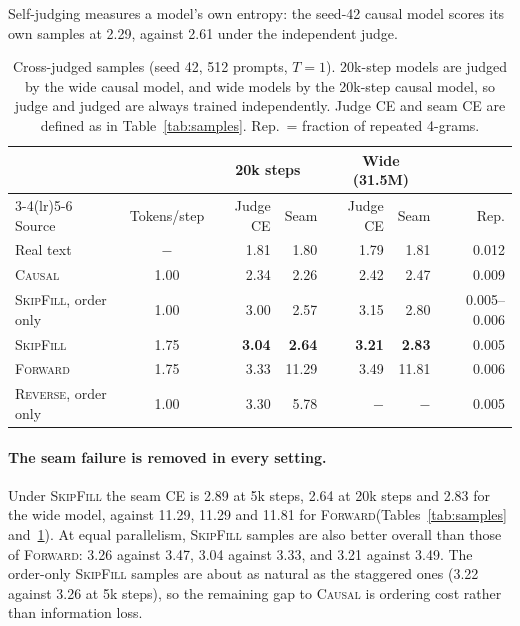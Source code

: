 \documentclass{article}
\theoremstyle{definition}
\theoremstyle{remark}
\newcommand{\name}[1]{\textup{\textsc{#1}}}
\newcommand{\sfill}{\name{SkipFill}\xspace}
\newcommand{\rev}{\name{Reverse}\xspace}
\newcommand{\fwd}{\name{Forward}\xspace}
\newcommand{\causal}{\name{Causal}\xspace}
\begin{document}
Self-judging measures a model's own entropy: the seed-42 causal model scores its own samples at 2.29, against 2.61 under the independent judge.

\begin{table}[t]
  \centering
  \caption{Cross-judged samples (seed 42, 512 prompts, $T=1$). 20k-step models are judged by the wide causal model, and wide models by the 20k-step causal model, so judge and judged are always trained independently. Judge CE and seam CE are defined as in Table~\ref{tab:samples}. Rep.\ = fraction of repeated 4-grams.}
  \label{tab:cross}
  \small
  \begin{tabular}{lcrrrrr}
    \toprule
    & & \multicolumn{2}{c}{20k steps} & \multicolumn{2}{c}{Wide (31.5M)} & \\
    \cmidrule(lr){3-4}\cmidrule(lr){5-6}
    Source & Tokens/step & Judge CE & Seam & Judge CE & Seam & Rep. \\
    \midrule
    Real text                   & $-$  & 1.81 & 1.80 & 1.79 & 1.81 & 0.012 \\
    \causal                     & 1.00 & 2.34 & 2.26 & 2.42 & 2.47 & 0.009 \\
    \sfill, order only          & 1.00 & 3.00 & 2.57 & 3.15 & 2.80 & 0.005--0.006 \\
    \sfill                      & 1.75 & \textbf{3.04} & \textbf{2.64} & \textbf{3.21} & \textbf{2.83} & 0.005 \\
    \fwd                        & 1.75 & 3.33 & 11.29 & 3.49 & 11.81 & 0.006 \\
    \rev, order only            & 1.00 & 3.30 & 5.78 & $-$ & $-$ & 0.005 \\
    \bottomrule
  \end{tabular}
\end{table}

\paragraph{The seam failure is removed in every setting.}
Under \sfill the seam CE is 2.89 at 5k steps, 2.64 at 20k steps and 2.83 for the wide model, against 11.29, 11.29 and 11.81 for \fwd (Tables~\ref{tab:samples} and~\ref{tab:cross}).
At equal parallelism, \sfill samples are also better overall than those of \fwd: 3.26 against 3.47, 3.04 against 3.33, and 3.21 against 3.49.
The order-only \sfill samples are about as natural as the staggered ones (3.22 against 3.26 at 5k steps), so the remaining gap to \causal is ordering cost rather than information loss.
\end{document}
